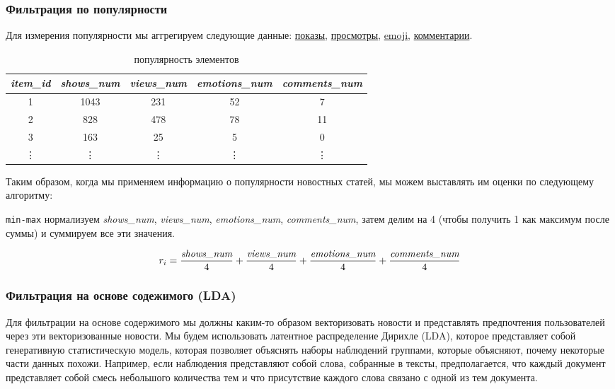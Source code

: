 \documentclass[14pt]{matmex-diploma-custom}
\begin{document}
\subsubsection{Фильтрация по популярности}

Для измерения популярности мы аггрегируем следующие данные: \hyperref[tab:show]{показы}, \hyperref[tab:view]{просмотры}, \hyperref[tab:emotion]{emoji}, \hyperref[tab:comment]{комментарии}.

\begin{table}[h]
    \centering
    \begin{tabular}{ccccc}
        \toprule

        \emph{item\_id} & \emph{shows\_num} & \emph{views\_num} & \emph{emotions\_num} & \emph{comments\_num} \\\midrule

        1 & 1043 & 231 & 52 & 7  \\
        2 & 828  & 478 & 78 & 11 \\
        3 & 163  & 25  & 5  & 0  \\
        \vdots & \vdots & \vdots & \vdots & \vdots \\\bottomrule


     \hline
    \end{tabular}

    \caption{популярность элементов}
    \label{tab:popularity}
\end{table}

Таким образом, когда мы применяем информацию о популярности новостных статей, мы можем выставлять им оценки по следующему алгоритму:

\texttt{min-max} нормализуем \emph{shows\_num}, \emph{views\_num}, \emph{emotions\_num}, \emph{comments\_num}, затем делим на 4 (чтобы получить 1 как максимум после суммы) и суммируем все эти значения.

\begin{equation}
    r_i = \frac{\emph{shows\_num}}{4} + \frac{\emph{views\_num}}{4} + \frac{\emph{emotions\_num}}{4} + \frac{\emph{comments\_num}}{4} 
\end{equation}


\subsubsection{Фильтрация на основе содежимого (LDA)}

Для фильтрации на основе содержимого мы должны каким-то образом векторизовать новости и представлять предпочтения пользователей через эти векторизованные новости. Мы будем использовать латентное распределение Дирихле (LDA), которое представляет собой генеративную статистическую модель, которая позволяет объяснять наборы наблюдений группами, которые объясняют, почему некоторые части данных похожи. Например, если наблюдения представляют собой слова, собранные в тексты, предполагается, что каждый документ представляет собой смесь небольшого количества тем и что присутствие каждого слова связано с одной из тем документа.
\end{document}
